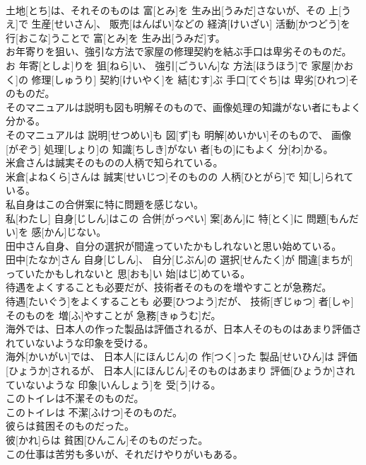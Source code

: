 \documentclass[8pt]{extreport}
\begin{document}
\begin{CJK}{UTF8}{min}
\\	土地[とち]は、それそのものは 富[とみ]を 生み出[うみだ]さないが、その 上[うえ]で 生産[せいさん]、 販売[はんばい]などの 経済[けいざい] 活動[かつどう]を 行[おこな]うことで 富[とみ]を 生み出[うみだ]す。
\\	お年寄りを狙い、強引な方法で家屋の修理契約を結ぶ手口は卑劣そのものだ。	
\\	お 年寄[としよ]りを 狙[ねら]い、 強引[ごういん]な 方法[ほうほう]で 家屋[かおく]の 修理[しゅうり] 契約[けいやく]を 結[むす]ぶ 手口[てぐち]は 卑劣[ひれつ]そのものだ。
\\	そのマニュアルは説明も図も明解そのもので、画像処理の知識がない者にもよく分かる。	
\\	そのマニュアルは 説明[せつめい]も 図[ず]も 明解[めいかい]そのもので、 画像[がぞう] 処理[しょり]の 知識[ちしき]がない 者[もの]にもよく 分[わ]かる。
\\	米倉さんは誠実そのものの人柄で知られている。	
\\	米倉[よねくら]さんは 誠実[せいじつ]そのものの 人柄[ひとがら]で 知[し]られている。
\\	私自身はこの合併案に特に問題を感じない。	
\\	私[わたし] 自身[じしん]はこの 合併[がっぺい] 案[あん]に 特[とく]に 問題[もんだい]を 感[かん]じない。
\\	田中さん自身、自分の選択が間違っていたかもしれないと思い始めている。	
\\	田中[たなか]さん 自身[じしん]、 自分[じぶん]の 選択[せんたく]が 間違[まちが]っていたかもしれないと 思[おも]い 始[はじ]めている。
\\	待遇をよくすることも必要だが、技術者そのものを増やすことが急務だ。	
\\	待遇[たいぐう]をよくすることも 必要[ひつよう]だが、 技術[ぎじゅつ] 者[しゃ]そのものを 増[ふ]やすことが 急務[きゅうむ]だ。
\\	海外では、日本人の作った製品は評価されるが、日本人そのものはあまり評価されていないような印象を受ける。	
\\	海外[かいがい]では、 日本人[にほんじん]の 作[つく]った 製品[せいひん]は 評価[ひょうか]されるが、 日本人[にほんじん]そのものはあまり 評価[ひょうか]されていないような 印象[いんしょう]を 受[う]ける。
\\	このトイレは不潔そのものだ。	
\\	このトイレは 不潔[ふけつ]そのものだ。
\\	彼らは貧困そのものだった。	
\\	彼[かれ]らは 貧困[ひんこん]そのものだった。
\\	この仕事は苦労も多いが、それだけやりがいもある。	

\end{CJK}
\end{document}

